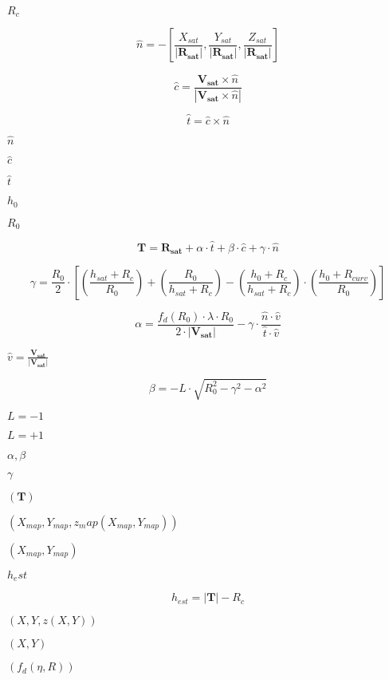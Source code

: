 \documentclass{article}
\begin{document}
$R_c$
\pagebreak

\[ \hat{n} = -\left[ \frac{X_{sat}}{\left| \mathbf{R_{sat}} \right|}, \frac{Y_{sat}}{\left| \mathbf{R_{sat}} \right|}, \frac{Z_{sat}}{\left| \mathbf{R_{sat}} \right|} \right] \]
\pagebreak

\[ \hat{c} = \frac{\mathbf{V_{sat}} \times \hat{n}}{\left| \mathbf{V_{sat}} \times \hat{n} \right| } \]
\pagebreak

\[ \hat{t} = \hat{c} \times \hat{n} \]
\pagebreak

$\hat{n}$
\pagebreak

$\hat{c}$
\pagebreak

$\hat{t}$
\pagebreak

$h_0$
\pagebreak

$R_0$
\pagebreak

\[ \mathbf{T} = \mathbf{R_{sat}} + \alpha \cdot \hat{t} + \beta \cdot \hat{c} + \gamma \cdot \hat{n} \]
\pagebreak

\[ \gamma = \frac{R_0}{2} \cdot \left[ \left( \frac{h_{sat} + R_c}{R_0}\right) + \left( \frac{R_0}{h_{sat} + R_c } \right) - \left( \frac{h_0 + R_c}{h_{sat}+R_c} \right) \cdot \left( \frac{h_0 + R_{curv}}{R_0} \right) \right] \]
\pagebreak

\[ \alpha = \frac{f_d\left(R_0\right) \cdot \lambda \cdot R_0}{2 \cdot \left| \mathbf{V_{sat}} \right|} - \gamma \cdot \frac{\hat{n} \cdot \hat{v}}{\hat{t} \cdot \hat{v}} \]
\pagebreak

$\hat{v} = \frac{\mathbf{V_{sat}}}{\left| \mathbf{V_{sat}} \right|}$
\pagebreak

\[ \beta = -L\cdot \sqrt{R_0^2 - \gamma^2 - \alpha^2} \]
\pagebreak

$L=-1$
\pagebreak

$L=+1$
\pagebreak

$ \alpha, \beta$
\pagebreak

$\gamma$
\pagebreak

$\left( \mathbf{T} \right)$
\pagebreak

$\left( X_{map}, Y_{map}, z_map\left(X_{map}, Y_{map}\right) \right)$
\pagebreak

$\left(X_{map}, Y_{map}\right)$
\pagebreak

$h_est$
\pagebreak

\[ h_{est} = \left| \mathbf{T} \right| - R_c \]
\pagebreak

$\left (X,Y, z\left(X,Y\right)\right)$
\pagebreak

$\left(X,Y\right)$
\pagebreak

$\left(f_d \left(\eta,R\right)\right)$
\pagebreak
\end{document}
